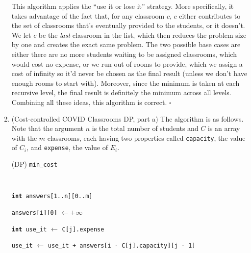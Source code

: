 \documentclass{article}
\begin{document}
\begin{enumerate}
    This algorithm applies the ``use it or lose it'' strategy. More specifically, it takes advantage of the fact that, for any classroom $c$, $c$ either contributes to the set of classrooms that's eventually provided to the students, or it doesn't. We let $c$ be the \textit{last} classroom in the list, which then reduces the problem size by one and creates the exact same problem. The two possible base cases are either there are no more students waiting to be assigned classrooms, which would cost no expense, or we run out of rooms to provide, which we assign a cost of infinity so it'd never be chosen as the final result (unless we don't have enough rooms to start with). Moreover, since the minimum is taken at each recursive level, the final result is definitely the minimum across all levels. Combining all these ideas, this algorithm is correct. $\square$

    \pagebreak

  \item (Cost-controlled COVID Classrooms DP, part a) The algorithm is as follows. Note that the argument $n$ is the total number of students and $C$ is an array with the $m$ classrooms, each having two properties called \texttt{capacity}, the value of $C_i$, and \texttt{expense}, the value of $E_i$.

    \begin{center}
      \begin{minipage}{0.875\linewidth}
        \renewcommand{\thealgocf}{}
        \begin{algorithm}[H]
          \caption{(DP) \texttt{min\_cost}}

          \texttt{\\}

          \texttt{\textbf{int} answers[1..n][0..m]}

          {
            \texttt{answers[i][0]} $\gets +\infty$
          }

          {
            {
              \texttt{\textbf{int} use\_it} $\gets$ \texttt{C[j].expense}

              {
                \texttt{use\_it} $\gets$ \texttt{use\_it + answers[i - C[j].capacity][j - 1]}
              }

}}
\end{algorithm}
\end{minipage}
\end{center}
\end{enumerate}
\end{document}
